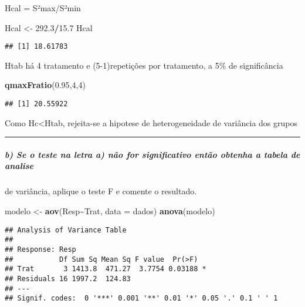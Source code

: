 \documentclass[
]{article}
\newenvironment{Shaded}{\begin{snugshade}}{\end{snugshade}}
\newcommand{\AttributeTok}[1]{\textcolor[rgb]{0.13,0.29,0.53}{#1}}
\newcommand{\DecValTok}[1]{\textcolor[rgb]{0.00,0.00,0.81}{#1}}
\newcommand{\FloatTok}[1]{\textcolor[rgb]{0.00,0.00,0.81}{#1}}
\newcommand{\FunctionTok}[1]{\textcolor[rgb]{0.13,0.29,0.53}{\textbf{#1}}}
\newcommand{\NormalTok}[1]{#1}
\newcommand{\OtherTok}[1]{\textcolor[rgb]{0.56,0.35,0.01}{#1}}
\newcommand{\SpecialCharTok}[1]{\textcolor[rgb]{0.81,0.36,0.00}{\textbf{#1}}}
\begin{document}
Hcal = S²max/S²min

\begin{Shaded}
\begin{Highlighting}[]
\NormalTok{Hcal }\OtherTok{\textless{}{-}} \FloatTok{292.3}\SpecialCharTok{/}\FloatTok{15.7}
\NormalTok{Hcal}
\end{Highlighting}
\end{Shaded}

\begin{verbatim}
## [1] 18.61783
\end{verbatim}

Htab há 4 tratamento e (5-1)repetições por tratamento, a 5\% de
significância

\begin{Shaded}
\begin{Highlighting}[]
\FunctionTok{qmaxFratio}\NormalTok{(}\FloatTok{0.95}\NormalTok{,}\DecValTok{4}\NormalTok{,}\DecValTok{4}\NormalTok{)}
\end{Highlighting}
\end{Shaded}

\begin{verbatim}
## [1] 20.55922
\end{verbatim}

Como Hc\textless Htab, rejeita-se a hipotese de heterogeneidade de
variância dos grupos

\begin{center}\rule{0.5\linewidth}{0.5pt}\end{center}

\hypertarget{b-se-o-teste-na-letra-a-nuxe3o-for-significativo-entuxe3o-obtenha-a-tabela-de-analise}{%
\subparagraph{b) Se o teste na letra a) não for significativo então
obtenha a tabela de
analise}\label{b-se-o-teste-na-letra-a-nuxe3o-for-significativo-entuxe3o-obtenha-a-tabela-de-analise}}

de variância, aplique o teste F e comente o resultado.

\begin{Shaded}
\begin{Highlighting}[]
\NormalTok{modelo }\OtherTok{\textless{}{-}} \FunctionTok{aov}\NormalTok{(Resp}\SpecialCharTok{\textasciitilde{}}\NormalTok{Trat, }\AttributeTok{data =}\NormalTok{ dados)}
\FunctionTok{anova}\NormalTok{(modelo) }
\end{Highlighting}
\end{Shaded}

\begin{verbatim}
## Analysis of Variance Table
## 
## Response: Resp
##           Df Sum Sq Mean Sq F value  Pr(>F)  
## Trat       3 1413.8  471.27  3.7754 0.03188 *
## Residuals 16 1997.2  124.83                  
## ---
## Signif. codes:  0 '***' 0.001 '**' 0.01 '*' 0.05 '.' 0.1 ' ' 1
\end{verbatim}
\end{document}
